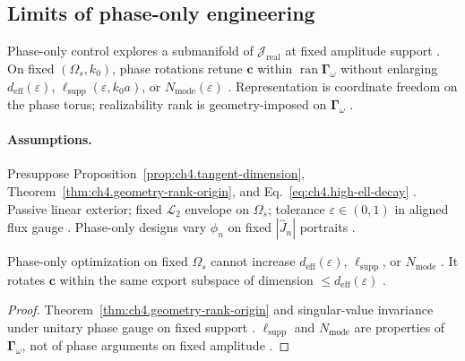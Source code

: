 ﻿\subsection{Limits of phase-only engineering}
\label{sec:ch492}

Phase-only control explores a submanifold of \(\mathcal{J}_{\mathrm{real}}\) at fixed amplitude support \cite{stratton1941,harrington2001,devaney2004}.
On fixed \((\Omega_{s},k_{0})\), phase rotations retune \(\mathbf{c}\) within \(\operatorname{ran}\boldsymbol{\Gamma}_\omega\) without enlarging
\(d_{\mathrm{eff}}(\varepsilon)\), \(\ell_{\mathrm{supp}}(\varepsilon,k_{0}a)\), or \(N_{\mathrm{mode}}(\varepsilon)\) \cite{hansen1988,jackson1999}.
Representation is coordinate freedom on the phase torus; realizability rank is geometry-imposed on \(\boldsymbol{\Gamma}_\omega\) \cite{stratton1941,devaney2004}.

\paragraph{Assumptions.}
Presuppose Proposition~\ref{prop:ch4.tangent-dimension}, Theorem~\ref{thm:ch4.geometry-rank-origin}, and Eq.~\eqref{eq:ch4.high-ell-decay}
\cite{stratton1941,harrington2001,devaney2004,hansen1988}. Passive linear exterior; fixed \(\mathcal{L}_{2}\) envelope on \(\Omega_{s}\); tolerance
\(\varepsilon\in(0,1)\) in aligned flux gauge \cite{jackson1999}. Phase-only designs vary \(\phi_{n}\) on fixed \(|\widehat{J}_{n}|\) portraits
\cite{collin2001,harrington2001}.

\begin{proposition}
\label{prop:ch4.phase-only-ceiling}
Phase-only optimization on fixed \(\Omega_{s}\) cannot increase \(d_{\mathrm{eff}}(\varepsilon)\), \(\ell_{\mathrm{supp}}\), or
\(N_{\mathrm{mode}}\) \cite{stratton1941,jackson1999,hansen1988,harrington2001}. It rotates \(\mathbf{c}\) within the same export
subspace of dimension \(\le d_{\mathrm{eff}}(\varepsilon)\) \cite{devaney2004}.
\end{proposition}
\begin{proof}
Theorem~\ref{thm:ch4.geometry-rank-origin} and singular-value invariance under unitary phase gauge on fixed support \cite{stratton1941,harrington2001}.
\(\ell_{\mathrm{supp}}\) and \(N_{\mathrm{mode}}\) are properties of \(\boldsymbol{\Gamma}_\omega\), not of phase arguments on fixed amplitude
\cite{hansen1988,jackson1999,devaney2004}.
\end{proof}

